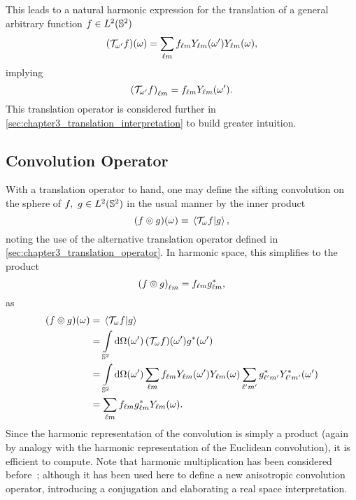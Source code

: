 This leads to a natural harmonic expression for the translation of a general arbitrary function \(f \in \hilbert{\twoSphere}\)
%
\begin{equation}\label{eq:chapter3_translation_real}
	\pixel{(\translation{\omega'}f)}
	= \harmonicSum \harmonic{f} \pixel[']{\harmonic{Y}} \pixel{\harmonic{Y}},
\end{equation}
%
implying
%
\begin{equation}\label{eq:chapter3_translation_harmonic}
	\harmonic{(\translation{\omega'}f)}
	= \harmonic{f} \pixel[']{\harmonic{Y}}.
\end{equation}
%
This translation operator is considered further in \cref{sec:chapter3_translation_interpretation} to build greater intuition.

\subsection{Convolution Operator}

With a translation operator to hand, one may define the sifting convolution on the sphere of \(f,\ g \in \hilbert{\twoSphere}\) in the usual manner by the inner product
%
\begin{equation}\label{eq:chapter3_convolution_real}
	\pixel{\convolution{f}{g}}
	\equiv \braket*{\translation{\omega}f}{g},
\end{equation}
%
noting the use of the alternative translation operator defined in \cref{sec:chapter3_translation_operator}.
In harmonic space, this simplifies to the product
%
\begin{equation}\label{eq:chapter3_convolution_harmonic}
	\harmonic{\convolution{f}{g}}
	= \harmonic{f} \conj{\harmonic{g}},
\end{equation}
%
as
%
\begin{align}
	\pixel{(f \circledcirc g)}
	 & = \braket*{\translation{\omega}f}{g} \nonumber{}                                                                                                                                        \\
	 & = \integrateSphere{\omega'} \pixel[']{(\translation{\omega}f)} \pixel[']{\conj{g}} \nonumber{}                                                                                          \\
	 & = \integrateSphere{\omega'} \harmonicSum \harmonic{f} \pixel[']{\harmonic{Y}} \pixel{\harmonic{Y}} \harmonicSum['] \conj{\harmonic[']{g}} \pixel[']{\conj{\harmonic[']{Y}}} \nonumber{} \\
	 & = \harmonicSum \harmonic{f} \conj{\harmonic{g}} \pixel{\harmonic{Y}}.
\end{align}
%
Since the harmonic representation of the convolution is simply a product (again by analogy with the harmonic representation of the Euclidean convolution), it is efficient to compute.
Note that harmonic multiplication has been considered before~\cite{Kennedy2011}; although it has been used here to define a new anisotropic convolution operator, introducing a conjugation and elaborating a real space interpretation.

